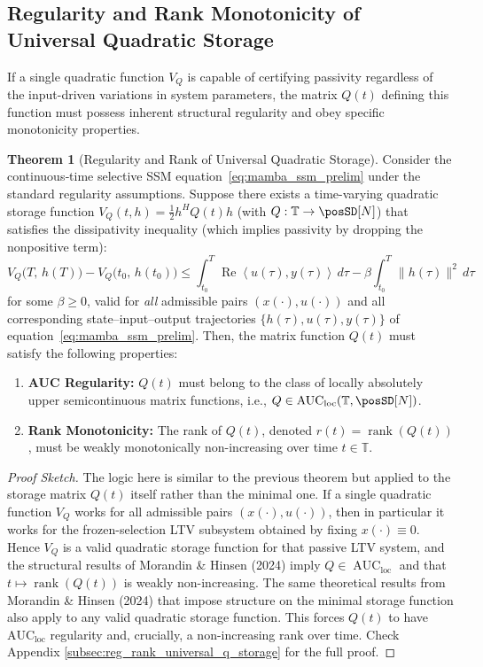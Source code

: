\documentclass[10pt]{article} %
\def\eqref#1{equation~\ref{#1}}
\newcommand{\timeInt}{\mathbb T}                        %
\newcommand{\loc}{\mathrm{loc}}                         %
\newcommand{\ip}[2]{\left\langle #1, #2 \right\rangle} %
\DeclareMathOperator{\realPart}{Re}                     %
\DeclareMathOperator{\AUC}{AUC}                         %
\DeclareMathOperator{\rank}{rank}                       %
\theoremstyle{definition}
\newtheorem{theorem}{Theorem}[section]
\begin{document}
\subsection{Regularity and Rank Monotonicity of Universal Quadratic Storage}
If a single quadratic function $V_Q$ is capable of certifying passivity regardless of the input-driven variations in system parameters, the matrix $Q(t)$ defining this function must possess inherent structural regularity and obey specific monotonicity properties.

\begin{theorem}[Regularity and Rank of Universal Quadratic Storage]
\label{thm:Q_regularity_rank} %
Consider the continuous‐time selective SSM \eqref{eq:mamba_ssm_prelim} under the standard regularity assumptions. Suppose there exists a time-varying quadratic storage function $V_Q(t,h) = \frac{1}{2} h^H Q(t) h$ (with $Q: \timeInt \to \posSD[N]$) that satisfies the dissipativity inequality (which implies passivity by dropping the nonpositive term):
\begin{equation} \label{eq:VQ_passivity_selective_repeat_sec4} %
V_Q\bigl(T,\,h(T)\bigr) - V_Q\bigl(t_0,\,h(t_0)\bigr) \le \int_{t_0}^{T} \realPart\ip{u(\tau)}{y(\tau)}\,d\tau - \beta\int_{t_0}^{T}\!\|h(\tau)\|^2\,d\tau
\end{equation}
for some $\beta \ge 0$, valid for \emph{all} admissible pairs $(x(\cdot),u(\cdot))$ and all corresponding state--input--output trajectories $\{h(\tau),u(\tau),y(\tau)\}$ of \eqref{eq:mamba_ssm_prelim}.
Then, the matrix function $Q(t)$ must satisfy the following properties:
\begin{enumerate}[label=(\alph*)]
    \item \textbf{AUC Regularity:} $Q(t)$ must belong to the class of locally absolutely upper semicontinuous matrix functions, i.e., $Q \in \AUC_\loc(\timeInt, \posSD[N])$.
    \item \textbf{Rank Monotonicity:} The rank of $Q(t)$, denoted $r(t) = \rank(Q(t))$, must be weakly monotonically non-increasing over time $t \in \timeInt$.
\end{enumerate}
\end{theorem}

\begin{proof}[Proof Sketch]
The logic here is similar to the previous theorem but applied to the storage matrix $Q(t)$ itself rather than the minimal one. If a single quadratic function $V_Q$ works for all admissible pairs $(x(\cdot),u(\cdot))$, then in particular it works for the frozen-selection LTV subsystem obtained by fixing $x(\cdot)\equiv 0$. Hence $V_Q$ is a valid quadratic storage function for that passive LTV system, and the structural results of Morandin \& Hinsen (2024) imply $Q\in\AUC_{\loc}$ and that $t\mapsto\rank(Q(t))$ is weakly non-increasing. The same theoretical results from Morandin \& Hinsen (2024) that impose structure on the minimal storage function also apply to any valid quadratic storage function. This forces $Q(t)$ to have $\text{AUC}_{\text{loc}}$ regularity and, crucially, a non-increasing rank over time.
Check Appendix \ref{subsec:reg_rank_universal_q_storage} for the full proof.
\end{proof}
\end{document}
